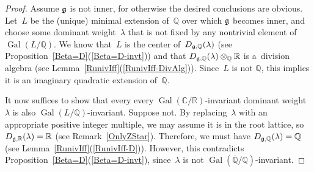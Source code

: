 \documentclass[10pt,a4paper]{amsart}
\DeclareMathOperator{\Gal}{Gal}
\numberwithin{equation}{section}
\newcommand{\Lie}[1]{\mathfrak{\lowercase{#1}}}
\begin{document}
\begin{proof}
Assume $\Lie G$ is not inner, for otherwise the desired conclusions are obvious.
Let~$L$ be the (unique) minimal extension of~$\mathbb{Q}$ over which $\Lie G$ becomes inner, and choose some dominant
weight~$\lambda$ that is not f\/ixed by any nontrivial element of~$\Gal(L/\mathbb{Q})$.
We know that~$L$ is the center of~$D_{\Lie G, \mathbb{Q}}(\lambda)$ (see Proposition~\ref{Beta=D}(\ref{Beta=D-invt})) and that $D_{\Lie
G, \mathbb{Q}}(\lambda) \otimes_\mathbb{Q} \mathbb{R}$ is a~division algebra (see Lemma~\ref{RunivIff}(\ref{RunivIff-DivAlg})).
Since~$L$ is not $\mathbb{Q}$, this implies it is an imaginary quadratic extension of~$\mathbb{Q}$.

It now suf\/f\/ices to show that every every $\Gal(\mathbb{C}/\mathbb{R})$-invariant dominant weight~$\lambda$ is also
$\Gal(L/\mathbb{Q})$-invariant.
Suppose not.
By replacing~$\lambda$ with an appropriate positive integer multiple, we may assume it is in the root lattice, so
$D_{\Lie G,\mathbb{R}}(\lambda) = \mathbb{R}$ (see Remark~\ref{OnlyZStar}).
Therefore, we must have $D_{\Lie G,\mathbb{Q}}(\lambda) = \mathbb{Q}$ (see Lemma~\ref{RunivIff}(\ref{RunivIff-D})).
However, this contradicts Proposition~\ref{Beta=D}(\ref{Beta=D-invt}), since~$\lambda$ is not
$\Gal(\overline{\mathbb{Q}}/\mathbb{Q})$-invariant.
\end{proof}
\end{document}
